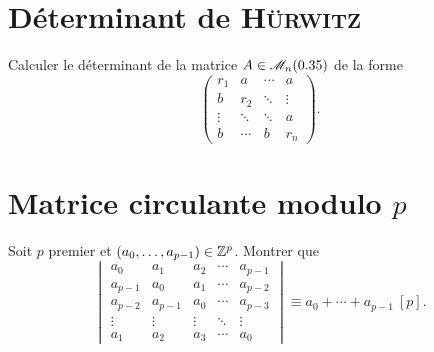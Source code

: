 \section{Déterminant de \textsc{Hürwitz}}
\begin{exercice}
    Calculer le déterminant de la matrice $A \in \mathscr{M}_n(0.35)$ de la forme
    $$
    \begin{pmatrix}
        r_1 & a & \cdots & a \\
        b & r_2 & \ddots & \vdots \\
        \vdots & \ddots & \ddots & a \\
        b & \cdots & b & r_n
    \end{pmatrix}.
    $$
\end{exercice}

\section{Matrice circulante modulo \texorpdfstring{$p$}{p}}

\begin{exercice}
    Soit $p$ premier et $(a_0, \dots, a_{p-1}) \in \mathbb{Z}^p$. Montrer que
    $$
    \begin{vmatrix}
        a_0 & a_1 & a_2 & \cdots & a_{p-1} \\
        a_{p-1} & a_0 & a_1 & \cdots & a_{p-2} \\
        a_{p-2} & a_{p-1} & a_0 & \cdots & a_{p-3} \\
        \vdots & \vdots & \vdots & \ddots & \vdots \\
        a_1 & a_2 & a_3 & \cdots & a_0
    \end{vmatrix}
    \equiv a_0 + \cdots + a_{p-1}\ [p].
    $$
\end{exercice}